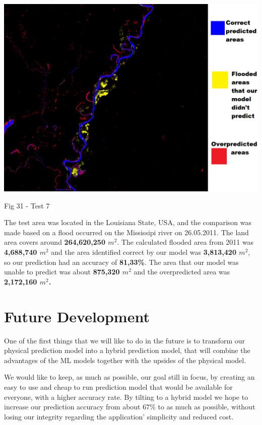 \documentclass[12pt, a4paper]{report}
\begin{document}
\bigskip
\includegraphics[scale=0.5, center]{test_7.png}
\begin{center}
Fig 31 - Test 7
\end{center}
\par 

The test area was located in the Louisiana State, USA, and the comparison was made based on a flood occurred on the Mississipi river on 26.05.2011. The land area covers around \textbf{264,620,250 $m^2$}. The calculated flooded area from 2011 was \textbf{4,688,740 $m^2$} and the area identified correct by our model was \textbf{3,813,420 $m^2$}, so our prediction had an accuracy of \textbf{81,33\%}. The area that our model was unable to predict was about \textbf{875,320 $m^2$} and the overpredicted area was \textbf{2,172,160 $m^2$.}

\newpage

\section{Future Development}

\quad
One of the first things that we will like to do in the future is to transform our physical prediction model into a hybrid prediction model, that will combine the advantages of the ML models together with the upsides of the physical model.
\par 

We would like to keep, as much as possible, our goal still in focus, by creating an easy to use and cheap to run prediction model that would be available for everyone, with a higher accuracy rate. By tilting to a hybrid model we hope to increase our prediction accuracy from about 67\% to as much as possible, without losing our integrity regarding the application' simplicity and reduced cost.
\par
\end{document}
